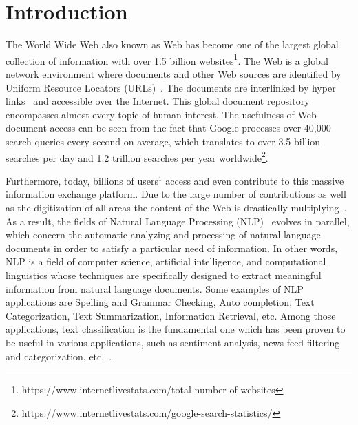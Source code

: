 \chapter{Introduction} \label{cha:introduction}
The World Wide Web also known as Web has become one of the largest global collection of information %
with over 1.5 billion websites\footnote{https://www.internetlivestats.com/total-number-of-websites}. The Web is a global network environment where documents and other Web sources are identified by Uniform Resource Locators (URLs)~\cite{berners1998uri}. The documents are interlinked by hyper links~\cite{jacobs2004architecture} and accessible over the Internet. This global document repository encompasses almost every topic of human interest. The usefulness of Web document access can be seen from the fact that Google processes over 40,000 search queries every second on average, which translates to over 3.5 billion searches per day and 1.2 trillion searches per year worldwide\footnote{https://www.internetlivestats.com/google-search-statistics/}. 

Furthermore, today, billions  of  users$^1$ access and even contribute to this massive information exchange platform. Due to the large number of contributions as well as the digitization of all areas the content of the Web is drastically multiplying~\cite{STCImprovedby}. %
As a result, the fields of Natural  Language  Processing (NLP)~\cite{Jurafsky:2009:SLP:1214993} evolves in parallel, which concern the automatic analyzing and processing of natural language documents in order to satisfy a particular need of information. In other words, NLP is a field of computer science, artificial intelligence, and computational linguistics whose techniques are specifically designed to extract meaningful information from natural language documents. Some examples of NLP applications are Spelling and Grammar Checking, Auto  completion, Text Categorization, Text Summarization, Information Retrieval, etc.   Among those applications, text classification is the fundamental one which has been proven to be useful in various applications, such as sentiment analysis, news feed filtering and categorization, etc.~\cite{STTopicMemory}.

